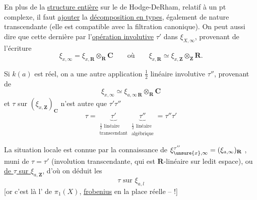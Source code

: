 En plus de la \uline{structure entière} sur le  de Hodge-DeRham, relatif à un pt complexe, il faut \uline{ajouter} la \uline{décomposition en types}, également de nature transcendante (elle est compatible avec la filtration canonique). On peut aussi dire que cette dernière   par l'\uline{opération involutive} $\tau'$  dans $\xi_{X,\infty}$, provenant de l'écriture
\[
\xi_{x,\infty}=\xi_{x,\mathbf R}\otimes_{\mathbf R}\mathbf C
\qquad\text{où}\qquad
\xi_{x,\mathbf R}\simeq\xi_{x,\mathbf Z}\otimes_{\mathbf Z}\mathbf R.
\]

Si $k(a)$ est réel, on a une autre application $\frac12$ linéaire involutive $\tau''$, provenant de
\[
\xi_{x,\infty}\simeq\xi_{a,\infty\,\mathbf R}\otimes_{\mathbf R}\mathbf C
\]
et $\tau$ sur $(\xi_{x,\mathbf Z})_{\mathbf C}$ n'est autre que $\tau'\tau''$
\[
\tau=\underbrace{\tau'}_{\substack{\frac12\text{ linéaire}\\\text{transcendant}}}\underbrace{\tau''}_{\substack{\frac12\text{ linéaire}\\\text{algébrique}}}=\tau''\tau'
\]

La situation locale  est connue par la connaissance de $\xi_{\unsure{x},\infty}^{\tau''}=(\xi_{a,\infty})_{\mathbf R}$ , muni de $\tau=\tau'$ (involution transcendante, qui est $\mathbf R$-linéaire sur ledit espace), ou  \uline{ de $\tau$ sur $\xi_{a,\mathbf Z}$}, d'où on déduit les
\[
\boxed{\tau\text{ sur }\xi_{a,l}}
\]
[or c'est là  l' de $\pi_1(X)$, \uline{frobenius} en la place réelle -- !]


